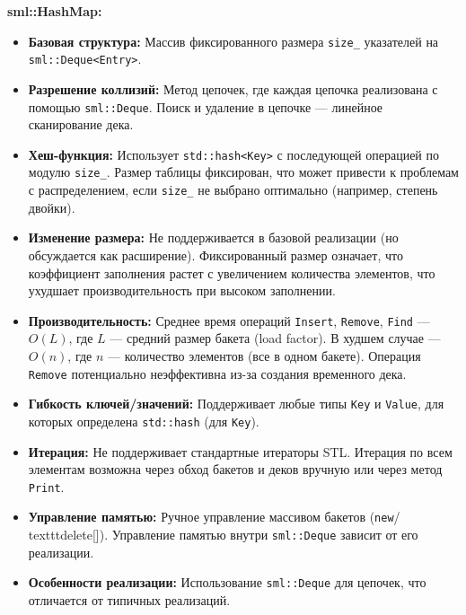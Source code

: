 \documentclass[a4paper,12pt]{article}
\begin{document}
\textbf{sml::HashMap:}
\begin{itemize}
    \item \textbf{Базовая структура:} Массив фиксированного размера \texttt{size\_} указателей на \texttt{sml::Deque<Entry>}.
    \item \textbf{Разрешение коллизий:} Метод цепочек, где каждая цепочка реализована с помощью \texttt{sml::Deque}. Поиск и удаление в цепочке --- линейное сканирование дека.
    \item \textbf{Хеш-функция:} Использует \texttt{std::hash<Key>} с последующей операцией по модулю \texttt{size\_}. Размер таблицы фиксирован, что может привести к проблемам с распределением, если \texttt{size\_} не выбрано оптимально (например, степень двойки).
    \item \textbf{Изменение размера:} Не поддерживается в базовой реализации (но обсуждается как расширение). Фиксированный размер означает, что коэффициент заполнения растет с увеличением количества элементов, что ухудшает производительность при высоком заполнении.
    \item \textbf{Производительность:} Среднее время операций \texttt{Insert}, \texttt{Remove}, \texttt{Find} --- $O(L)$, где $L$ --- средний размер бакета (load factor). В худшем случае --- $O(n)$, где $n$ --- количество элементов (все в одном бакете). Операция \texttt{Remove} потенциально неэффективна из-за создания временного дека.
    \item \textbf{Гибкость ключей/значений:} Поддерживает любые типы \texttt{Key} и \texttt{Value}, для которых определена \texttt{std::hash} (для \texttt{Key}).
    \item \textbf{Итерация:} Не поддерживает стандартные итераторы STL. Итерация по всем элементам возможна через обход бакетов и деков вручную или через метод \texttt{Print}.
    \item \textbf{Управление памятью:} Ручное управление массивом бакетов (\texttt{new}/\\texttt{delete[]}). Управление памятью внутри \texttt{sml::Deque} зависит от его реализации.
    \item \textbf{Особенности реализации:} Использование \texttt{sml::Deque} для цепочек, что отличается от типичных реализаций.
\end{itemize}
\end{document}
